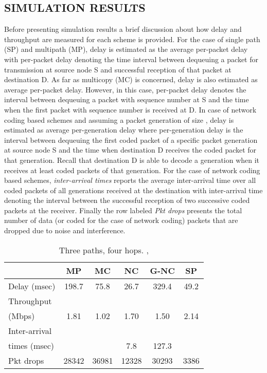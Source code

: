 \documentclass[journal, onecolumn, 12pt]{IEEEtran}
\begin{document}
\subsection{\uppercase{Simulation Results}}
\label{sec:sim_result}

Before presenting simulation results a brief discussion about how delay and throughput are measured for each scheme is provided.
For the case of single path (SP) and multipath (MP), delay is estimated as the average per-packet delay with per-packet delay denoting the time
interval between dequeuing a packet for transmission at source node S and successful reception of that packet at destination D.
As far as multicopy (MC) is concerned, delay is also estimated as average per-packet delay. However, in this case, per-packet delay denotes the interval
between dequeuing a packet with sequence number  at S and the time when the first packet with sequence number  is received at D.
In case of network coding based schemes and assuming a packet generation of size , delay is estimated as average per-generation delay where per-generation delay is the interval between dequeuing
the first coded packet of a specific packet generation  at source node S and the time when destination D receives the  coded packet for that generation.
Recall that destination D is able to decode a generation when it receives at least  coded packets of that generation.
For the case of network coding based schemes, \textit{inter-arrival times} reports the average inter-arrival time over all coded packets of all generations received at the destination
with inter-arrival time denoting the interval between the successful reception of two successive coded packets at the receiver.
Finally the row labeled \textit{Pkt drops} presents the total number of data (or coded for the case of network coding) packets that are dropped due to noise and interference.

\begin{table}[t]
\begin{center}
\scriptsize
\begin{tabular}{|l|c|c|c|c|c|}
\hline
~                                    & MP & MC & NC & G-NC & SP \\ \hline
Delay (msec)   & 198.7   & 75.8  & 26.7  & 329.4 & 49.2  \\ \hline
Throughput                   & ~  & ~  & ~  & ~         & ~  \\
(Mbps)                   & 1.81  & 1.02  & 1.70 & 1.50 & 2.14 \\ \hline
Inter-arrival              & ~  & ~  & ~  & ~         & ~  \\
times (msec)   &   &   &  7.8 & 127.3 & \\ \hline
Pkt drops  & 28342  & 36981  & 12328  & 30293 & 3386 \\ \hline
\end{tabular}
\end{center}
\caption {Three paths, four hops. , }
\label{tab:sim_topol_1}
\end{table}
\end{document}
